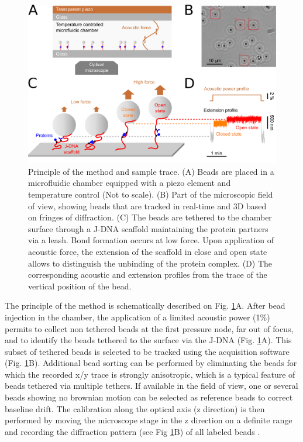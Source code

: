 \documentclass{biophys-new}
\begin{document}
\begin{figure}[hbt!]
	\centering
	\includegraphics[width=0.75\linewidth]{Figures/fig1.png}
	\caption{Principle of the method and sample trace. (A) Beads are placed in a microfluidic chamber equipped with a piezo element and temperature control (Not to scale). (B) Part of the microscopic field of view, showing beads that are tracked in real-time and 3D based on fringes of diffraction. (C) The beads are tethered to the chamber surface through a J-DNA scaffold maintaining the protein partners via a leash. Bond formation occurs at low force. Upon application of acoustic force, the extension of the scaffold in close and open state allows to distinguish the unbinding of the protein complex. (D) The corresponding acoustic and extension profiles from the trace of the vertical position of the bead. }
	\label{fig:principle}
\end{figure}
 
The principle of the method is schematically described on Fig. \ref{fig:principle}A. After bead injection in the chamber, the application of a limited acoustic power (1\%) permits to collect non tethered beads at the first pressure node, far out of focus, and to identify the beads tethered to the surface via the J-DNA (Fig. \ref{fig:principle}A). This subset of tethered beads is selected to be tracked using the acquisition software (Fig. \ref{fig:principle}B). Additional bead sorting can be performed by eliminating the beads for which the recorded x/y trace is strongly anisotropic, which is a typical feature of beads tethered via multiple tethers. If available in the field of view, one or several beads showing no brownian motion can be selected as reference beads to correct baseline drift. The calibration along the optical axis (z direction) is then performed by moving the microscope stage in the z direction on a definite range and recording the diffraction pattern (see Fig \ref{fig:principle}B) of all labeled beads \cite{gosse2002, sitters2015}. 
\end{document}
